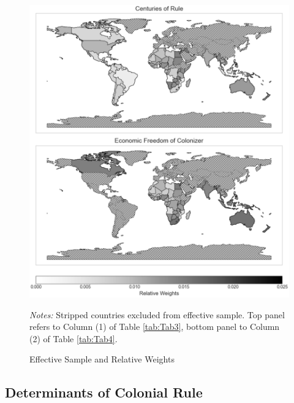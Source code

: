 \documentclass[a4paper,12pt]{article}
\begin{document}
\renewcommand{\thetable}{B\arabic{table}}
\renewcommand{\thefigure}{B\arabic{figure}}

\begin{figure}[!h]
    \centering
    \includegraphics[width=\textwidth]{Plots/output.eps}
    \caption{Effective Sample and Relative Weights}
    \smallskip
    {\footnotesize \textit{Notes:} Stripped countries excluded from effective sample. Top panel refers to Column (1) of Table \ref{tab:Tab3}, bottom panel to Column (2) of Table \ref{tab:Tab4}.}
    \label{fig:FigB1}
\end{figure}

\vspace{5cm}


\clearpage


\clearpage


\clearpage


\clearpage


\clearpage


\clearpage
\subsection{Determinants of Colonial Rule}
\end{document}
